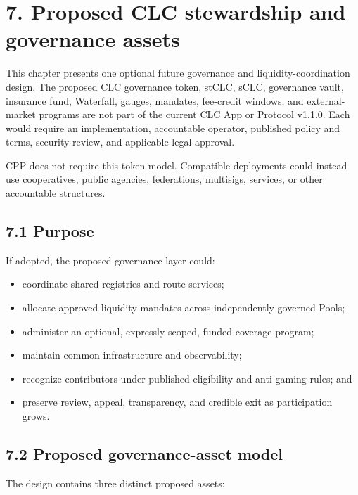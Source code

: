 \documentclass[11pt]{article}
\begin{document}
\section*{7. Proposed CLC stewardship and governance assets}

This chapter presents one optional future governance and liquidity-coordination design. The proposed CLC governance token, stCLC, sCLC, governance vault, insurance fund, Waterfall, gauges, mandates, fee-credit windows, and external-market programs are not part of the current CLC App or Protocol v1.1.0. Each would require an implementation, accountable operator, published policy and terms, security review, and applicable legal approval.

CPP does not require this token model. Compatible deployments could instead use cooperatives, public agencies, federations, multisigs, services, or other accountable structures.

\subsection*{7.1 Purpose}

If adopted, the proposed governance layer could:

\begin{itemize}[leftmargin=*]
\item coordinate shared registries and route services;
\item allocate approved liquidity mandates across independently governed Pools;
\item administer an optional, expressly scoped, funded coverage program;
\item maintain common infrastructure and observability;
\item recognize contributors under published eligibility and anti-gaming rules; and
\item preserve review, appeal, transparency, and credible exit as participation grows.
\end{itemize}
\subsection*{7.2 Proposed governance-asset model}

The design contains three distinct proposed assets:
\end{document}
